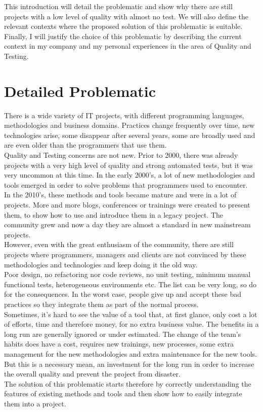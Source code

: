 This introduction will detail the problematic and show why there are
still projects with a low level of quality with almost no test.
We will also define the relevant contexts where the proposed solution
of this problematic is suitable.
Finally, I will justify the choice of this problematic by describing the
current context in my company and my personal experiences in the area of
Quality and Testing.
\section{Detailed Problematic}\label{sec:detailed-problematic}
There is a wide variety of IT projects, with different programming
languages, methodologies and business domains.
Practices change frequently over time, new technologies arise,
some disappear after several years, some are broadly used and are even
older than the programmers that use them. \\
Quality and Testing concerns are not new.
Prior to 2000, there was already projects with a very high level of
quality and strong automated tests, but it was very uncommon at this
time.
In the early 2000's, a lot of new methodologies and tools emerged in
order to solve problems that programmers used to encounter. \\
In the 2010's, these methods and tools became mature and were in a
lot of projects.
More and more blogs, conferences or trainings were created to present
them, to show how to use and introduce them in a legacy project.
The community grew and now a day they are almost a standard in new
mainstream projects. \\
\newline
However, even with the great enthusiasm of the community, there are
still projects where programmers, managers and clients are not convinced
by these methodologies and technologies and keep doing it the old way. \\
Poor design, no refactoring nor code reviews, no unit testing, minimum
manual functional tests, heterogeneous environments etc.
The list can be very long, so do for the consequences.
In the worst case, people give up and accept these bad practices so they
integrate them as part of the normal process. \\
Sometimes, it's hard to see the value of a tool that, at first glance,
only cost a lot of efforts, time and therefore money, for no extra
business value.
The benefits in a long run are generally ignored or under estimated.
The change of the team's habits does have a cost, requires new trainings,
new processes, some extra management for the new methodologies and
extra maintenance for the new tools.
But this is a necessary mean, an investment for the long run in order to
increase the overall quality and prevent the project from disaster. \\
\newline
The solution of this problematic starts therefore by correctly
understanding the features of existing methods and tools and then
show how to easily integrate them into a project.


